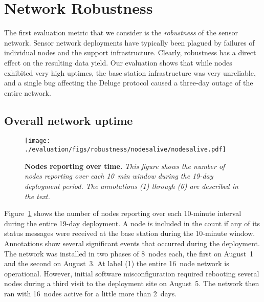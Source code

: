 \section{Network Robustness}
\label{sec-robustness}

The first evaluation metric that we consider is the {\em robustness}
of the sensor network.  Sensor network deployments have typically been
plagued by failures of individual nodes and the support
infrastructure. Clearly, robustness has a direct effect on the
resulting data yield.  Our evaluation shows that while nodes exhibited
very high uptimes, the base station
infrastructure was very unreliable, and a single
bug affecting the Deluge protocol caused a three-day outage of
the entire network.


\subsection{Overall network uptime}

\begin{figure}[t]
\begin{center}
\texttt{[image: ./evaluation/figs/robustness/nodesalive/nodesalive.pdf]}
\end{center}
\caption{\small{\bf Nodes reporting over time.}
{\em This figure shows the number of nodes reporting over each
10~min window during the 19-day deployment period. 
The annotations (1) through (6) are described in the text.}}
\label{fig-nodesalive}
\end{figure}

Figure~\ref{fig-nodesalive} shows the number of nodes reporting over each
10-minute interval during the entire 19-day deployment. A node is included in
the count if any of its status messages were received at the base station
during the 10-minute window.  Annotations show several significant events
that occurred during the deployment. The network was installed in two phases
of 8~nodes each, the first on August~1 and the second on August~3.  At label
(1) the entire 16~node network is operational.  However, initial software
misconfiguration required rebooting several nodes during a third visit to
the deployment site on August~5.  The network then ran with 16~nodes active
for a little more than 2~days. 

